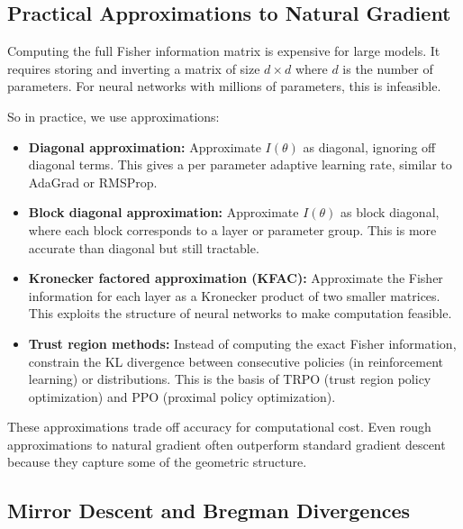 \vspace{1.5em}

\subsection{Practical Approximations to Natural Gradient}

Computing the full Fisher information matrix is expensive for large models. It requires storing and inverting a matrix of size $d \times d$ where $d$ is the number of parameters. For neural networks with millions of parameters, this is infeasible.

So in practice, we use approximations:

\begin{itemize}
\item \textbf{Diagonal approximation:} Approximate $I(\theta)$ as diagonal, ignoring off diagonal terms. This gives a per parameter adaptive learning rate, similar to AdaGrad or RMSProp.

\item \textbf{Block diagonal approximation:} Approximate $I(\theta)$ as block diagonal, where each block corresponds to a layer or parameter group. This is more accurate than diagonal but still tractable.

\item \textbf{Kronecker factored approximation (KFAC):} Approximate the Fisher information for each layer as a Kronecker product of two smaller matrices. This exploits the structure of neural networks to make computation feasible.

\item \textbf{Trust region methods:} Instead of computing the exact Fisher information, constrain the KL divergence between consecutive policies (in reinforcement learning) or distributions. This is the basis of TRPO (trust region policy optimization) and PPO (proximal policy optimization).
\end{itemize}

\vspace{1em}

These approximations trade off accuracy for computational cost. Even rough approximations to natural gradient often outperform standard gradient descent because they capture some of the geometric structure.

\vspace{1.5em}

\subsection{Mirror Descent and Bregman Divergences}

